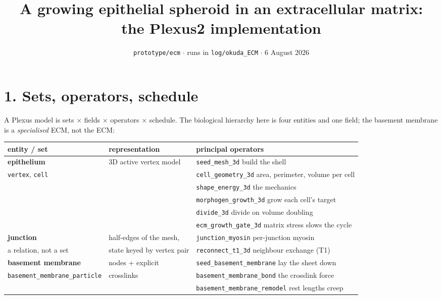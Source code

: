 \documentclass[10pt,a4paper]{article}
\title{\vspace{-1.4cm}\textbf{A growing epithelial spheroid in an extracellular matrix:\\
the Plexus2 implementation}}
\author{}
\date{\vspace{-0.9cm}\small \texttt{prototype/ecm} $\cdot$ runs in \texttt{log/okuda\_ECM} $\cdot$ 6 August 2026}
\newcommand{\op}[1]{\texttt{#1}}
\begin{document}
\maketitle\vspace{-1.1cm}

\section*{1.\; Sets, operators, schedule}

A Plexus model is sets $\times$ fields $\times$ operators $\times$ schedule. The biological hierarchy
here is four entities and one field; the basement membrane is a \emph{specialised} ECM, not the ECM:

\smallskip
{\small
\begin{tabular}{@{}lll@{}}
\toprule
entity / set & representation & principal operators\\
\midrule
\textbf{epithelium}          & 3D active vertex model  & \op{seed\_mesh\_3d} \quad build the shell\\
\op{vertex}, \op{cell}       &                         & \op{cell\_geometry\_3d} \quad area, perimeter, volume per cell\\
                             &                         & \op{shape\_energy\_3d} \quad the mechanics\\
                             &                         & \op{morphogen\_growth\_3d} \quad grow each cell's target\\
                             &                         & \op{divide\_3d} \quad divide on volume doubling\\
                             &                         & \op{ecm\_growth\_gate\_3d} \quad matrix stress slows the cycle\\
\midrule
\textbf{junction}            & half-edges of the mesh, & \op{junction\_myosin} \quad per-junction myosin\\
a relation, not a set        & state keyed by vertex pair & \op{reconnect\_t1\_3d} \quad neighbour exchange (T1)\\
\midrule
\textbf{basement membrane}   & nodes + explicit        & \op{seed\_basement\_membrane} \quad lay the sheet down\\
\op{basement\_membrane\_particle} & crosslinks         & \op{basement\_membrane\_bond} \quad the crosslink force\\
                             &                         & \op{basement\_membrane\_remodel} \quad rest lengths creep\\

\end{tabular}}
\end{document}
